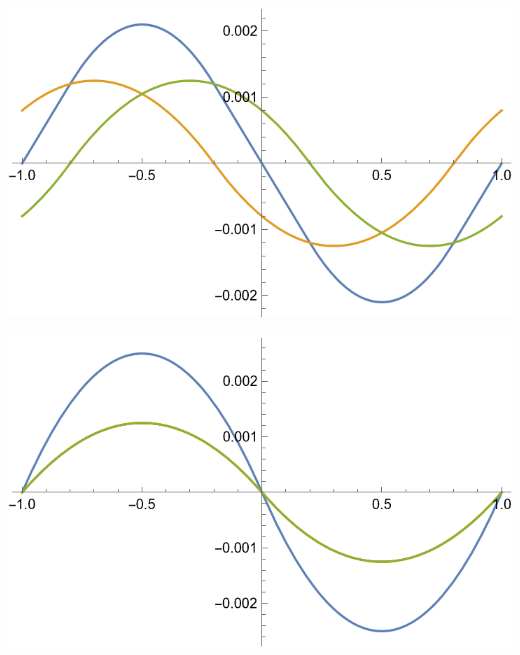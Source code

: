 \documentclass[10pt]{article}
\begin{document}
\begin{center}
    \begin{minipage}{0.49\linewidth}
        \includegraphics[width=\textwidth]{IMG/3-0.8.png}
    \end{minipage}
    \hfill
    \begin{minipage}{0.49\linewidth}
        \includegraphics[width=\textwidth]{IMG/3-1.0.png}
    \end{minipage}
\end{center}

\newpage
\end{document}
